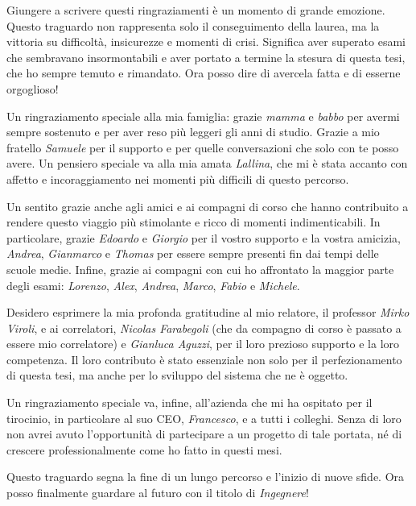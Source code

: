 \begin{acknowledgements}
  Giungere a scrivere questi ringraziamenti è un momento di grande emozione. Questo traguardo non rappresenta solo il conseguimento della laurea, ma la vittoria su difficoltà, insicurezze e momenti di crisi. Significa aver superato esami che sembravano insormontabili e aver portato a termine la stesura di questa tesi, che ho sempre temuto e rimandato. Ora posso dire di avercela fatta e di esserne orgoglioso!

  Un ringraziamento speciale alla mia famiglia: grazie \emph{mamma} e \emph{babbo} per avermi sempre sostenuto e per aver reso più leggeri gli anni di studio. Grazie a mio fratello \emph{Samuele} per il supporto e per quelle conversazioni che solo con te posso avere. Un pensiero speciale va alla mia amata \emph{Lallina}, che mi è stata accanto con affetto e incoraggiamento nei momenti più difficili di questo percorso.

  Un sentito grazie anche agli amici e ai compagni di corso che hanno contribuito a rendere questo viaggio più stimolante e ricco di momenti indimenticabili. In particolare, grazie \emph{Edoardo} e \emph{Giorgio} per il vostro supporto e la vostra amicizia, \emph{Andrea}, \emph{Gianmarco} e \emph{Thomas} per essere sempre presenti fin dai tempi delle scuole medie. Infine, grazie ai compagni con cui ho affrontato la maggior parte degli esami: \emph{Lorenzo}, \emph{Alex}, \emph{Andrea}, \emph{Marco}, \emph{Fabio} e \emph{Michele}.

  Desidero esprimere la mia profonda gratitudine al mio relatore, il professor \emph{Mirko Viroli}, e ai correlatori, \emph{Nicolas Farabegoli} (che da compagno di corso è passato a essere mio correlatore) e \emph{Gianluca Aguzzi}, per il loro prezioso supporto e la loro competenza. Il loro contributo è stato essenziale non solo per il perfezionamento di questa tesi, ma anche per lo sviluppo del sistema che ne è oggetto.

  Un ringraziamento speciale va, infine, all'azienda che mi ha ospitato per il tirocinio, in particolare al suo CEO, \emph{Francesco}, e a tutti i colleghi. Senza di loro non avrei avuto l'opportunità di partecipare a un progetto di tale portata, né di crescere professionalmente come ho fatto in questi mesi.

  Questo traguardo segna la fine di un lungo percorso e l’inizio di nuove sfide. Ora posso finalmente guardare al futuro con il titolo di \textit{Ingegnere}!
\end{acknowledgements}
